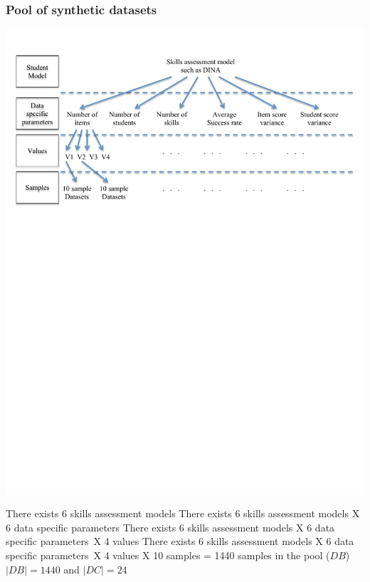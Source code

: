 \documentclass{beamer}
\begin{document}
\begin{frame}\frametitle{Pool of synthetic datasets}
\includegraphics[trim=1cm 17cm 1cm 1cm,scale=0.55]{images/Data-Gen-Break-Down.pdf}
\begin{overprint}
 There exists 6 skills assessment models 
 There exists 6 skills assessment models X 6 data specific parameters 
 There exists 6 skills assessment models X 6 data specific parameters~X 4 values 
 There exists 6 skills assessment models X 6 data specific parameters~X 4 values X 10 samples = 1440 samples in the pool ($DB$)
 $|DB| = 1440$ and $|DC| = 24$
\end{overprint}
\end{frame}
\end{document}
